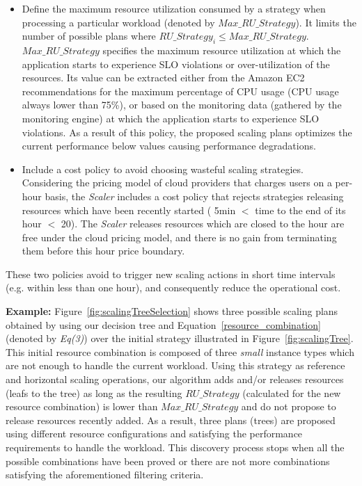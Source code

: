 \begin{itemize}

\item Define the maximum resource utilization consumed  by a strategy when processing a particular workload (denoted by \emph{$Max\_RU\_Strategy$}). It limits the number of possible plans where \emph{$RU\_Strategy_{i} \leq Max\_RU\_Strategy$}. \emph{$Max\_RU\_Strategy$} specifies the maximum resource utilization at which the application starts to experience SLO violations or over-utilization of the resources. Its value can be extracted either from the Amazon EC2 recommendations for the maximum percentage of CPU usage (CPU usage always lower than 75\%), or based on the monitoring data (gathered by the monitoring engine) at which the application starts to experience SLO violations. As a result of this policy, the proposed scaling plans optimizes the current performance below values causing performance degradations. 


\item Include a cost policy to avoid choosing wasteful scaling strategies. Considering the pricing model of cloud providers that charges users on a per-hour basis, the \emph{Scaler} includes a cost policy that rejects strategies releasing resources which have been recently started ( 5min $<$ time to the end of its hour $<$ 20). The \emph{Scaler} releases resources which are closed to the hour are free under the cloud pricing model, and there is no gain from terminating them before this hour price boundary.

\end{itemize}

These two policies avoid to trigger new scaling actions in short time intervals (e.g. within less than one hour), and consequently reduce the operational cost. 


\noindent\textbf{Example:} Figure~\ref{fig:scalingTreeSelection} shows three possible scaling plans obtained by using our decision tree and Equation~\ref{resource_combination} (denoted by \emph{Eq(3)}) over the initial strategy illustrated in Figure~\ref{fig:scalingTree}. This initial resource combination is composed of three \emph{small} instance types which are not enough to handle the current workload. Using this strategy as reference and horizontal scaling operations, our algorithm adds and/or releases resources (leafs to the tree) as long as the resulting \emph{$RU\_Strategy$} (calculated for the new resource combination) is lower than \emph{$Max\_RU\_Strategy$} and do not propose to release resources recently added. As a result, three plans (trees) are proposed using different resource configurations and satisfying the performance requirements to handle the workload. This discovery process stops when all the possible combinations have been proved or there are not more combinations satisfying the aforementioned filtering criteria. 



